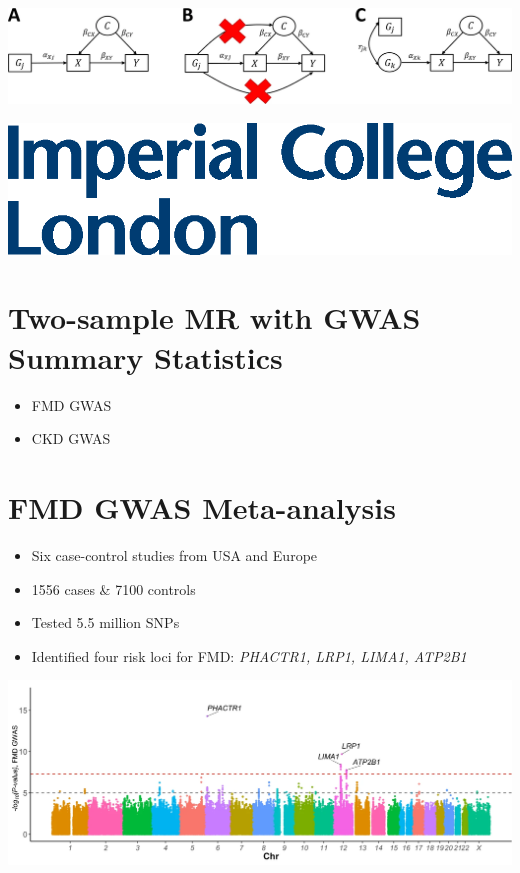 \documentclass[a0paper,fleqn]{betterposter}
\begin{document}
{%
    \includegraphics[width=\textwidth]{mr.png} %
    \cite{de2022understanding}




\vfill

\includegraphics[width=\textwidth]{img/logo}\\

}{
\section{Two-sample MR with GWAS Summary Statistics}
\begin{itemize}
\item FMD GWAS \cite{georges2021genetic}
\item CKD GWAS \cite{neale_lab_gwas}
\end{itemize}


\section{FMD GWAS Meta-analysis \cite{georges2021genetic}}
\begin{itemize}
\item Six case-control studies from USA and Europe  
\item 1556 cases \& 7100 controls  
\item Tested 5.5 million SNPs  
\item Identified four risk loci for FMD: \textit{PHACTR1, LRP1, LIMA1, ATP2B1}  
\end{itemize}
\includegraphics[width=\textwidth]{georges2021-Fig1.png} 




}
\end{document}
